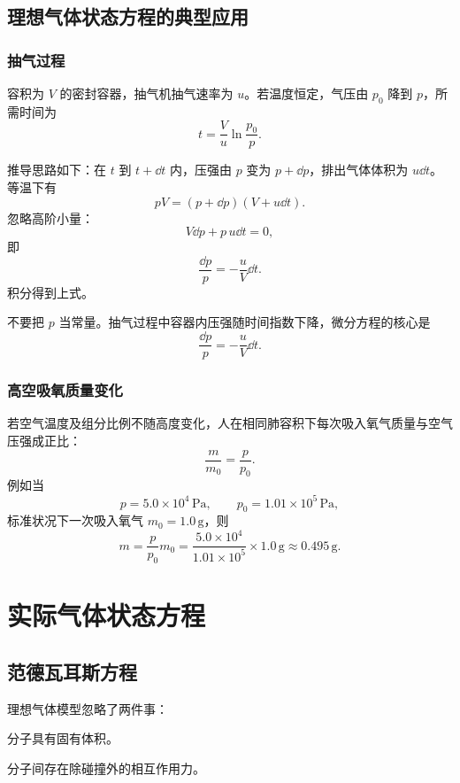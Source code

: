 \subsection{理想气体状态方程的典型应用}

\subsubsection{抽气过程}

容积为 \(V\) 的密封容器，抽气机抽气速率为 \(u\)。若温度恒定，气压由 \(p_0\) 降到 \(p\)，所需时间为
\[
  \boxed{t=\frac{V}{u}\ln\frac{p_0}{p}}.
\]

推导思路如下：在 \(t\) 到 \(t+\dd t\) 内，压强由 \(p\) 变为 \(p+\dd p\)，排出气体体积为 \(u\dd t\)。等温下有
\[
  pV=(p+\dd p)(V+u\dd t).
\]
忽略高阶小量：
\[
  V\dd p+p\,u\dd t=0,
\]
即
\[
  \frac{\dd p}{p}=-\frac{u}{V}\dd t.
\]
积分得到上式。

\begin{WarnBox}[抽气题常见错法]
不要把 \(p\) 当常量。抽气过程中容器内压强随时间指数下降，微分方程的核心是
\[
  \frac{\dd p}{p}=-\frac{u}{V}\dd t.
\]
\end{WarnBox}

\subsubsection{高空吸氧质量变化}

若空气温度及组分比例不随高度变化，人在相同肺容积下每次吸入氧气质量与空气压强成正比：
\[
  \frac{m}{m_0}=\frac{p}{p_0}.
\]
例如当
\[
  p=5.0\times 10^4\,\mathrm{Pa},
  \qquad
  p_0=1.01\times 10^5\,\mathrm{Pa},
\]
标准状况下一次吸入氧气 \(m_0=1.0\,\mathrm g\)，则
\[
  m=\frac{p}{p_0}m_0
  =
  \frac{5.0\times 10^4}{1.01\times 10^5}\times 1.0\,\mathrm g
  \approx 0.495\,\mathrm g.
\]

\section{实际气体状态方程}

\subsection{范德瓦耳斯方程}

理想气体模型忽略了两件事：
\begin{ReviewList}
  \item 分子具有固有体积。
  \item 分子间存在除碰撞外的相互作用力。
\end{ReviewList}

